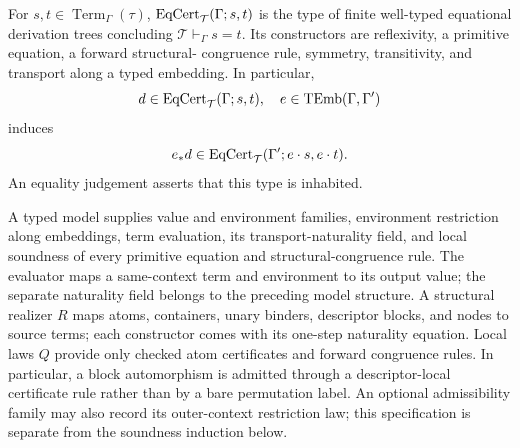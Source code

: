 \begin{definition}
\label{def:eq-derivation}
For $s,t\in\operatorname{Term}_\Gamma(\tau)$,
$\operatorname{EqCert}_{\mathcal T}(\Gamma;s,t)$ is the type of finite well-typed
equational derivation trees concluding $\mathcal T\vdash_\Gamma s=t$.  Its
constructors are reflexivity, a primitive equation, a forward structural-
congruence rule, symmetry, transitivity, and transport along a typed
embedding.  In particular,
\[
d\in\operatorname{EqCert}_{\mathcal T}(\Gamma;s,t),\quad
e\in\operatorname{TEmb}(\Gamma,\Gamma')
\]
induces
\[
e_*d\in\operatorname{EqCert}_{\mathcal T}
(\Gamma';e\cdot s,e\cdot t).
\]
An equality judgement asserts that this type is inhabited.
\end{definition}

A typed model supplies value and environment families, environment
restriction along embeddings, term evaluation, its transport-naturality field,
and local soundness of every primitive equation and structural-congruence rule.
The evaluator maps a same-context term and environment to its output value;
the separate naturality field belongs to the preceding model structure.
A structural realizer $R$ maps atoms, containers, unary
binders, descriptor blocks, and nodes to source terms; each constructor comes
with its one-step naturality equation.  Local laws $Q$ provide only checked
atom certificates and forward congruence rules.  In particular, a block
automorphism is admitted through a descriptor-local certificate rule rather
than by a bare permutation label.  An optional admissibility family may also
record its outer-context restriction law; this specification is separate from
the soundness induction below.

